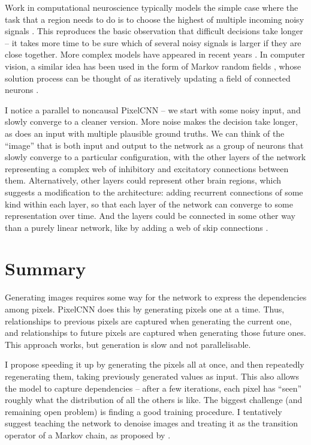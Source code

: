 \documentclass[11pt, a4paper, openany]{book}
\newcommand{\nquote}[1]{``{#1}''}
\begin{document}
Work in computational neuroscience typically models the simple case where the task that a region needs to do is to choose the highest of multiple incoming noisy signals \citep{kopecz1995saccadic,decisions1,decisions2,douglas2004neuronal,cisek2007cortical}. This reproduces the basic observation that difficult decisions take longer -- it takes more time to be sure which of several noisy signals is larger if they are close together. More complex models have appeared in recent years \citep{cisek2010neural,sandamirskaya2010embodied,dnfrobots3,dnfrobots,rcnnbio}. In computer vision, a similar idea has been used in the form of Markov random fields \citep{mrf1}, whose solution process can be thought of as iteratively updating a field of connected neurons \citep{crfrcnn}.

I notice a parallel to noncausal PixelCNN -- we start with some noisy input, and slowly converge to a cleaner version. More noise makes the decision take longer, as does an input with multiple plausible ground truths. We can think of the \nquote{image} that is both input and output to the network as a group of neurons that slowly converge to a particular configuration, with the other layers of the network representing a complex web of inhibitory and excitatory connections between them. Alternatively, other layers could represent other brain regions, which suggests a modification to the architecture: adding recurrent connections of some kind within each layer, so that each layer of the network can converge to some representation over time. And the layers could be connected in some other way than a purely linear network, like by adding a web of skip connections \citep{denselyconnected}.


\section{Summary}
Generating images requires some way for the network to express the dependencies among pixels. PixelCNN does this by generating pixels one at a time. Thus, relationships to previous pixels are captured when generating the current one, and relationships to future pixels are captured when generating those future ones. This approach works, but generation is slow and not parallelisable.

I propose speeding it up by generating the pixels all at once, and then repeatedly regenerating them, taking previously generated values as input. This also allows the model to capture dependencies -- after a few iterations, each pixel has \nquote{seen} roughly what the distribution of all the others is like. The biggest challenge (and remaining open problem) is finding a good training procedure. I tentatively suggest teaching the network to denoise images and treating it as the transition operator of a Markov chain, as proposed by \citet{denoisinggenerative}.
\end{document}
